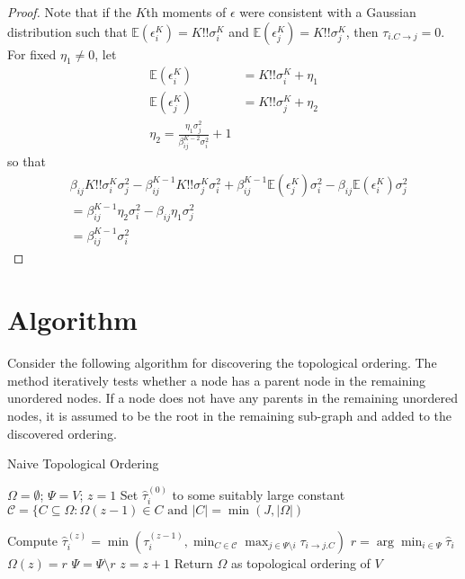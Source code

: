 \documentclass[]{article}
\newcommand{\E}{\mathbb{E}}
\begin{document}
\begin{proof}
Note that if the $K$th moments of $\epsilon$ were consistent with a Gaussian distribution such that $\E(\epsilon_i^K) = K!!\sigma_i^K$ and $\E(\epsilon_j^K) = K!!\sigma_j^K$, then $\tau_{i.C \rightarrow j} = 0$. For fixed $\eta_1 \neq 0$, let
\begin{equation}
\begin{aligned}
	\E(\epsilon_i^K) &= K!!\sigma_i^K + \eta_1\\
	\E(\epsilon_j^K) &= K!!\sigma_j^K + \eta_2\\
	\eta_2 = \frac{\eta_1\sigma_j^2}{\beta_{ij}^{K-2}\sigma_i^2} + 1
\end{aligned}
\end{equation}
so that
\begin{equation}
\begin{aligned}
&\beta_{ij}K!!\sigma_i^K\sigma_j^2 - \beta_{ij}^{K-1}K!!\sigma_j^K \sigma_i^2  + \beta_{ij}^{K-1}\E(\epsilon_j^K)\sigma_i^2 - \beta_{ij}\E(\epsilon_i^K)\sigma_j^2\\
&= \beta_{ij}^{K-1}\eta_2\sigma_i^2 - \beta_{ij}\eta_1\sigma_j^2\\
&= \beta_{ij}^{K-1}\sigma_i^2
\end{aligned}
\end{equation}
\end{proof}


\section{Algorithm}

Consider the following algorithm for discovering the topological ordering. The method iteratively tests whether a node has a parent node in the remaining unordered nodes. If a node does not have any parents in the remaining unordered nodes, it is assumed to be the root in the remaining sub-graph and added to the discovered ordering.

\begin{algorithm}[htbp!]
\caption{\label{alg:topOrder}Naive Topological Ordering}
\begin{algorithmic}
\State $\Omega = \emptyset$; $\Psi = V$; $z = 1$
\State Set $\hat \tau_{i}^{(0)}$ to some suitably large constant
	\State $\mathcal{C} = \{C \subseteq \Omega: \Omega(z-1) \in C \text{ and } |C| = \min(J, |\Omega|)$

	\State Compute $\hat \tau_{i}^{(z)} = \min\left(\tau_{i}^{(z-1)}, \min_{C \in \mathcal{C}} \max_{j \in \Psi \setminus i} \tau_{i\rightarrow j.C}\right)$
	\EndFor
	\State $r = \arg\min_{i \in \Psi} \hat \tau_{i}$
	\State $\Omega(z) = r$
	\State $\Psi = \Psi \setminus r$
	\State $z = z + 1$
\EndWhile
\State Return $\Omega$ as topological ordering of $V$
\end{algorithmic}
\end{algorithm}
\end{document}

